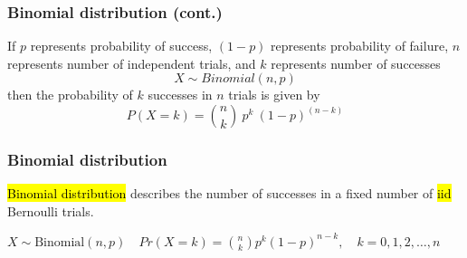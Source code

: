 \documentclass[slidestop,compress,mathserif]{beamer}
\makeatletter
\def\weekv@path{../../Week5}
\makeatother
\begin{document}

\begin{frame}
\frametitle{Binomial distribution (cont.)}

{
If $p$ represents probability of success, $(1-p)$ represents probability of failure, $n$ represents number of independent trials, and $k$ represents number of successes 
\[X\sim Binomial(n, p)\]
then the probability of $k$ successes in $n$ trials is given by
\[P(X=k) = {n \choose k}~p^k~(1-p)^{(n-k)} \]
} 

\end{frame}

\begin{frame}
\frametitle{Binomial distribution}

\hl{Binomial distribution} describes the number of successes in a fixed number of \hl{iid} Bernoulli trials.

\begin{small}
$X \sim \text{Binomial}(n, p) \quad
Pr(X=k) = {n \choose k} p^k (1-p)^{n-k}, 
\quad k = 0, 1, 2, \ldots, n$
\end{small}
\vspace{-0.5cm}

\end{frame}
\end{document}
